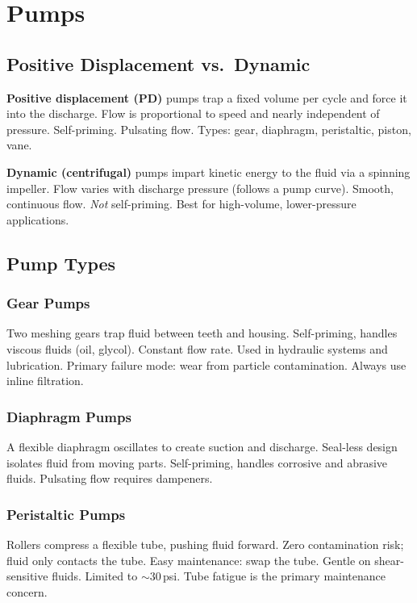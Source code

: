 \documentclass[11pt,letterpaper,twoside,openany]{book}
\begin{document}
\section{Pumps}

\subsection{Positive Displacement vs.\ Dynamic}

\textbf{Positive displacement (PD)} pumps trap a fixed volume per cycle and force it into the discharge. Flow is proportional to speed and nearly independent of pressure. Self-priming. Pulsating flow. Types: gear, diaphragm, peristaltic, piston, vane.

\textbf{Dynamic (centrifugal)} pumps impart kinetic energy to the fluid via a spinning impeller. Flow varies with discharge pressure (follows a pump curve). Smooth, continuous flow. \emph{Not} self-priming. Best for high-volume, lower-pressure applications.

\subsection{Pump Types}

\subsubsection{Gear Pumps}
Two meshing gears trap fluid between teeth and housing. Self-priming, handles viscous fluids (oil, glycol). Constant flow rate. Used in hydraulic systems and lubrication. Primary failure mode: wear from particle contamination. Always use inline filtration.

\subsubsection{Diaphragm Pumps}
A flexible diaphragm oscillates to create suction and discharge. Seal-less design isolates fluid from moving parts. Self-priming, handles corrosive and abrasive fluids. Pulsating flow requires dampeners.

\subsubsection{Peristaltic Pumps}
Rollers compress a flexible tube, pushing fluid forward. Zero contamination risk; fluid only contacts the tube. Easy maintenance: swap the tube. Gentle on shear-sensitive fluids. Limited to $\sim$30\,psi. Tube fatigue is the primary maintenance concern.
\end{document}
